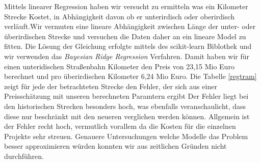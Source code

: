 Mittels linearer Regression haben wir versucht zu ermitteln was ein Kilometer Strecke Kostet, in Abhängigkeit davon ob er unterirdisch oder oberirdisch verläuft.Wir vermuten eine lineare Abhängigkeit zwischen Länge der unter- oder überirdischen Strecke und versuchen die Daten daher an ein lineare Model zu fitten.  Die Lösung der Gleichung erfolgte mittels des scikit-learn Biblothek und wir verwenden das \emph{ Bayesian Ridge Regression} Verfahren. Damit haben wir für einen unteridischen Straßenbahn Kilometer den Preis von 23,15 Mio Euro berechnet und pro überirdischen Kilometer 6,24 Mio Euro. Die Tabelle \ref{regtram} zeigt für jede der betrachteten Strecke den Fehler, der sich aus einer Preisschätzung mit unseren berechneten Paramtern ergibt Der Fehler liegt bei den historischen Strecken besonders hoch, was ebenfalls veranschaulicht, dass diese nur beschränkt mit den neueren verglichen werden können. Allgemein ist der Fehler recht hoch, vermutlich vorallem da die Kosten für die einzelnen Projekte sehr streuen.  Genauere Untersuchungen welche Modelle das Problem besser approximieren würden konnten wir aus zeitlichen Gründen nicht durchführen.
